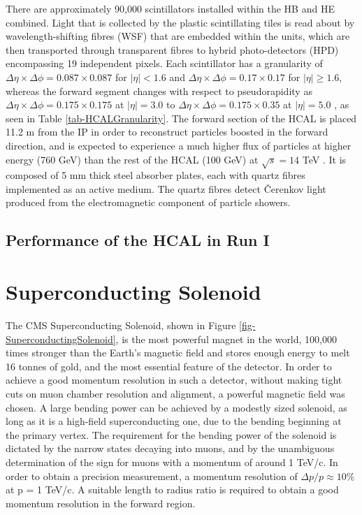 There are approximately 90,000 scintillators installed within the HB and HE combined. Light that is collected by the plastic scintillating tiles is read about by wavelength-shifting fibres (WSF) that are embedded within the units, which are then transported through transparent fibres to hybrid photo-detectors (HPD) encompassing 19 independent pixels. Each scintillator has a granularity of $\Delta \eta \times \Delta \phi = 0.087 \times 0.087$ for $|\eta|<1.6$ and $\Delta \eta \times \Delta \phi = 0.17 \times 0.17$ for $|\eta| \ge 1.6$, whereas the forward segment changes with respect to pseudorapidity as $\Delta \eta \times \Delta \phi = 0.175 \times 0.175$ at $|\eta| = 3.0$ to $\Delta \eta \times \Delta \phi = 0.175 \times 0.35$ at $|\eta| = 5.0$ \cite{HCALTdr}, as seen in Table \ref{tab-HCALGranularity}. The forward section of the HCAL is placed 11.2 m from the IP in order to reconstruct particles boosted in the forward direction, and is expected to experience a much higher flux of particles at higher energy (760 GeV) than the rest of the HCAL (100 GeV) at $\sqrt{s}=14$ TeV \cite{HCALUpgradeTdr}. It is composed of 5 mm thick steel absorber plates, each with quartz fibres implemented as an active medium. The quartz fibres detect \v{C}erenkov light produced from the electromagnetic component of particle showers.

\subsection{Performance of the HCAL in Run I}   



\section{Superconducting Solenoid} \label{sec-SuperconductingSolenoid}

The CMS Superconducting Solenoid, shown in Figure \ref{fig-SuperconductingSolenoid}, is the most powerful magnet in the world, 100,000 times stronger than the Earth's magnetic field and stores enough energy to melt 16 tonnes of gold, and the most essential feature of the detector. In order to achieve a good momentum resolution in such a detector, without making tight cuts on muon chamber resolution and alignment, a powerful magnetic field was chosen. A large bending power can be achieved by a modestly sized solenoid, as long as it is a high-field superconducting one, due to the bending beginning at the primary vertex. The requirement for the bending power of the solenoid is dictated by the narrow states decaying into muons, and by the unambiguous determination of the sign for muons with a momentum of around 1 TeV/c. In order to obtain a precision measurement, a momentum resolution of $\Delta p/p\approx10\%$ at p = 1 TeV/c. A suitable length to radius ratio is required to obtain a good momentum resolution in the forward region.  

